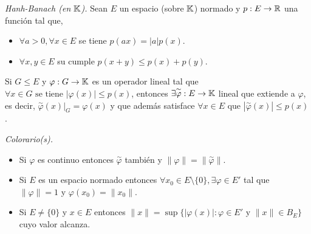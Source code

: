 \begin{theorem}
    \emph{Hanh-Banach (en \(\mathbb{K}\)).} Sean \(E\) un espacio (sobre \(\mathbb{K}\)) normado y \(p:E\to \mathbb{R}\) una función tal que, 
    \begin{itemize}
        \item \(\forall a>0,\forall x\in E\) se tiene \(p(ax) = |a|p(x)\). 
        \item \(\forall x,y\in E\) su cumple \(p(x+y) \leq p(x)+p(y)\). 
    \end{itemize} 
    Si \(G\leq E \) y \(\varphi : G \to \mathbb{K}\) es un operador lineal tal que \(\forall x\in G \text{ se tiene }|\varphi(x)|\leq p(x)\), entonces \(\exists \overset{\sim }{\varphi} : E \to \mathbb{K}\) lineal que extiende a \(\varphi\), es decir, \(\overset{\sim }{\varphi}(x)\Big|_{G} = \varphi(x) \) y que además satisface \(\forall x\in E \text{ que }|\overset{\sim}{\varphi}(x)|\leq p(x)\). 
\end{theorem}
\begin{note}
    \emph{Colorario(s).} \begin{itemize}
        \item Si \(\varphi \) es continuo entonces \(\overset{\sim}{\varphi}\) también y \(\|\varphi\| = \|\overset{\sim}{\varphi}\|\). 
        \item Si \(E\) es un espacio normado entonces \(\forall x_0\in E \setminus \{0\},\exists \varphi\in E'\) tal que \(\|\varphi\| = 1\) y \(\varphi(x_0) = \|x_0\|\). 
        \item Si \(E\neq \{0\}\) y \(x\in E \) entonces \(\|x\| = \sup\{ |\varphi(x)|: \varphi \in E' \text{ y } \|x\|\in B_E\} \) cuyo valor alcanza.   
    \end{itemize}
\end{note}